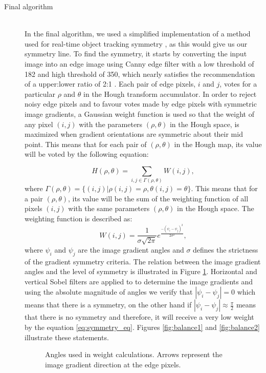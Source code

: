 \begin{description}
	\item[Final algorithm] \hfill \\
	In the final algorithm, we used a simplified implementation of a method used for real-time object tracking symmetry \cite{li2006real}, as this would give us our symmetry line. To find the symmetry, it starts by converting the input image into an edge image using Canny edge filter with a low threshold of 182 and high threshold of 350, which nearly satisfies the recommendation of a upper:lower ratio of 2:1 \cite{OCV}. Each pair of edge pixels, $i$ and $j$, votes for a particular $\rho$ and $\theta$ in the Hough transform accumulator. In order to reject noisy edge pixels and to favour votes made by edge pixels with symmetric image gradients, a Gaussian weight function is used so that the weight of any pixel $(i,j)$ with the parameters $(\rho,\theta)$ in the Hough space, is maximized when gradient orientations are symmetric about their mid point. This means that for each pair of $(\rho,\theta)$  in the Hough map, its value will be voted by the following equation:

\begin{equation}
	H(\rho,\theta) = \sum_{i,j \in \Gamma(\rho,\theta)}W(i,j),
\end{equation}		
where $\Gamma(\rho,\theta) = \{(i,j) | \rho(i,j) = \rho, \theta(i,j) = \theta\}$.
This means that for a pair $(\rho,\theta)$, its value will be the sum of the weighting function of all pixels $(i,j)$ with the same parameters $(\rho,\theta)$ in the Hough space. The weighting function is described as:
\begin{equation}
	W(i,j) = \frac{1}{\sigma\sqrt{2\pi}}e^{\frac{-(\psi_{i}-\psi_{j})^{2}}{2\sigma^{2}}},
	\label{eq:symmetry_eq}
\end{equation}
where $\psi_{i}$ and $\psi_{j}$ are the image gradient angles and $\sigma$ defines the strictness of the gradient symmetry criteria. The relation between the image gradient angles and the level of symmetry is illustrated in Figure \ref{fig:image_balance_fig}. Horizontal and vertical Sobel filters are applied to to determine the image gradients and using the absolute magnitude of angles we verify that $|\psi_{i} - \psi_{j}| = 0$ which means that there is a symmetry, on the other hand if $|\psi_{i} - \psi_{j}| \approx \frac{\pi}{2}$ means that there is no symmetry and therefore, it will receive a very low weight by the equation \ref{eq:symmetry_eq}. Figures \ref{fig:balance1} and \ref{fig:balance2} illustrate these statements.
\begin{figure}[htbp]
	\centering
    \caption{Angles used in weight calculations. Arrows represent the image gradient direction at the edge pixels. \cite{li2006real}}
    \label{fig:image_balance_fig}
\end{figure}


\end{description}
